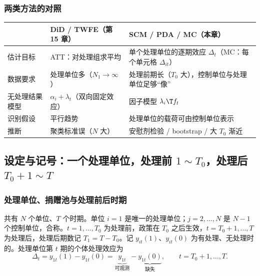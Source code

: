 \subsubsection{两类方法的对照}

\begin{center}
\small
\begin{tabularx}{\linewidth}{lLL}
\toprule
 & DiD / TWFE（第 15 章） & SCM / PDA / MC（本章）\\
\midrule
估计目标 & ATT：对处理组求平均 & 单个处理单位的逐期效应 $\Delta_t$（MC：每个单元格 $\Delta_{it}$）\\
数据要求 & 处理单位多（$N_1\to\infty$） & 处理前期长（$T_0$ 大），控制单位与处理单位足够“像”\\
无处理结果模型 & $\alpha_i+\lambda_t$（双向固定效应） & 因子模型 $\lambda_i\T f_t$\\
识别假设 & 平行趋势 & 处理单位的载荷可由控制单位表示\\
推断 & 聚类标准误（$N$ 大） & 安慰剂检验 / bootstrap / 大 $T_0$ 渐近\\
\bottomrule
\end{tabularx}
\label{tab:U16-did-vs-scm}
\end{center}

\subsection{设定与记号：一个处理单位，处理前 \texorpdfstring{$1\sim T_0$}{1 to T0}，处理后 \texorpdfstring{$T_0+1\sim T$}{T0+1 to T}}

\subsubsection{处理单位、捐赠池与处理前后时期}

\begin{defn}[个体处理效应的设定]
共有 $N$ 个单位、$T$ 个时期。单位 $i=1$ 是唯一的处理单位；$j=2,\dots,N$ 是 $N-1$ 个控制单位，合称。$t=1,\dots,T_0$ 为处理前，政策在 $T_0$ 之后生效，$t=T_0+1,\dots,T$ 为处理后，处理后期数记 $T_1=T-T_0$。记 $y_{it}(1)$、$y_{it}(0)$ 为有处理、无处理时的。处理单位第 $t$ 期的个体处理效应为
\begin{equation}\label{eq:U16-delta}
\Delta_t=y_{1t}(1)-y_{1t}(0)=\underbrace{y_{1t}}_{\text{可观测}}-\underbrace{y_{1t}(0)}_{\text{缺失}},\qquad t=T_0+1,\dots,T.
\end{equation}
\end{defn}

